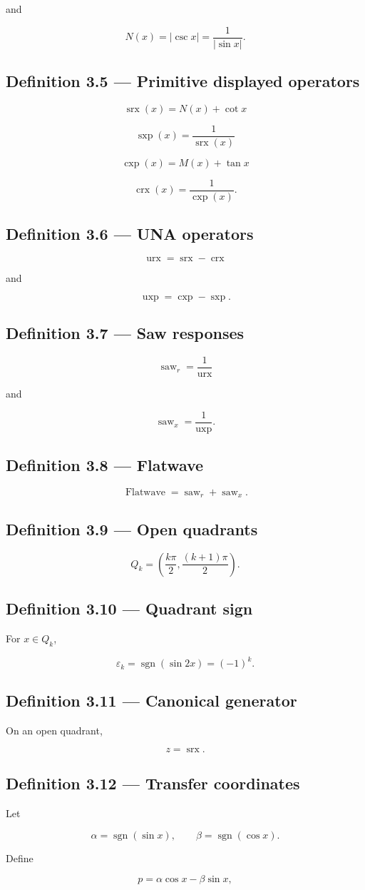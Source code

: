 \documentclass[11pt,oneside,openany]{book}
\newcommand{\PCsubsection}[1]{%
  \subsection*{#1}%
}
\begin{document}
and

\[
N(x)=|\csc x| = \frac1{|\sin x|}.
\]

\PCsubsection{Definition 3.5 --- Primitive displayed operators}

\[
\boxed{ \operatorname{srx}(x)=N(x)+\cot x }
\]

\[
\boxed{ \operatorname{sxp}(x)=\frac1{\operatorname{srx}(x)} }
\]

\[
\boxed{ \operatorname{cxp}(x)=M(x)+\tan x }
\]

\[
\boxed{ \operatorname{crx}(x)=\frac1{\operatorname{cxp}(x)}. }
\]

\PCsubsection{Definition 3.6 --- UNA operators}

\[
\boxed{ \operatorname{urx} = \operatorname{srx}-\operatorname{crx} }
\]

and

\[
\boxed{ \operatorname{uxp} = \operatorname{cxp}-\operatorname{sxp}. }
\]

\PCsubsection{Definition 3.7 --- Saw responses}

\[
\boxed{ \operatorname{saw}_{r} = \frac1{\operatorname{urx}} }
\]

and

\[
\boxed{ \operatorname{saw}_{x} = \frac1{\operatorname{uxp}}. }
\]

\PCsubsection{Definition 3.8 --- Flatwave}

\[
\boxed{ \operatorname{Flatwave} = \operatorname{saw}_{r}+\operatorname{saw}_{x} }.
\]


\PCsubsection{Definition 3.9 --- Open quadrants}

\[
Q_k = \left( \frac{k\pi}{2}, \frac{(k+1)\pi}{2} \right).
\]

\PCsubsection{Definition 3.10 --- Quadrant sign}

For \(x\in Q_k\),

\[
\boxed{ \varepsilon_k = \operatorname{sgn}(\sin 2x) = (-1)^k. }
\]

\PCsubsection{Definition 3.11 --- Canonical generator}

On an open quadrant,

\[
\boxed{ z=\operatorname{srx}. }
\]

\PCsubsection{Definition 3.12 --- Transfer coordinates}

Let

\[
\alpha=\operatorname{sgn}(\sin x), \qquad \beta=\operatorname{sgn}(\cos x).
\]

Define

\[
p=\alpha\cos x-\beta\sin x,
\]
\end{document}
